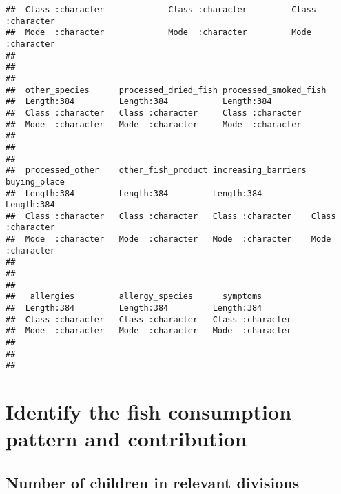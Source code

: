 \documentclass[
]{article}
\begin{document}
\begin{verbatim}
##  Class :character             Class :character         Class :character     
##  Mode  :character             Mode  :character         Mode  :character     
##                                                                             
##                                                                             
##                                                                             
##  other_species      processed_dried_fish processed_smoked_fish
##  Length:384         Length:384           Length:384           
##  Class :character   Class :character     Class :character     
##  Mode  :character   Mode  :character     Mode  :character     
##                                                               
##                                                               
##                                                               
##  processed_other    other_fish_product increasing_barriers buying_place      
##  Length:384         Length:384         Length:384          Length:384        
##  Class :character   Class :character   Class :character    Class :character  
##  Mode  :character   Mode  :character   Mode  :character    Mode  :character  
##                                                                              
##                                                                              
##                                                                              
##   allergies         allergy_species      symptoms        
##  Length:384         Length:384         Length:384        
##  Class :character   Class :character   Class :character  
##  Mode  :character   Mode  :character   Mode  :character  
##                                                          
##                                                          
## 
\end{verbatim}

\hypertarget{identify-the-fish-consumption-pattern-and-contribution}{%
\section{Identify the fish consumption pattern and
contribution}\label{identify-the-fish-consumption-pattern-and-contribution}}

\hypertarget{number-of-children-in-relevant-divisions}{%
\subsection{Number of children in relevant
divisions}\label{number-of-children-in-relevant-divisions}}
\end{document}
